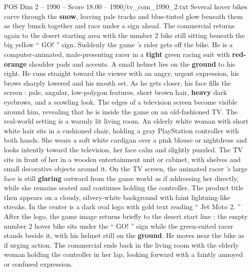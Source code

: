 \begin{textsample}{POS Dim 2 – 1990 – Score 18.00 – 1990/tv\_com\_1990\_2.txt}
Several hover bikes carve through the \textbf{snow}, leaving pale tracks and blue-tinted glow beneath them as they bunch together and race under a sign ahead.
The commercial returns again to the desert starting area with the number 2 bike still sitting beneath the big yellow “ GO! ” sign.
Suddenly the game ’s rider gets off the bike.
He is a computer-animated, male-presenting racer in a \textbf{tight} green racing suit with \textbf{red-orange} shoulder pads and accents.
A small helmet lies on the \textbf{ground} to his right.
He runs straight toward the viewer with an angry, urgent expression, his brows sharply lowered and his mouth set.
As he gets closer, his face fills the screen : pale, angular, low-polygon features, short brown hair, \textbf{heavy} dark eyebrows, and a scowling look.
The edges of a television screen become visible around him, revealing that he is inside the game on an old-fashioned TV.
The real-world setting is a warmly lit living room.
An elderly white woman with short white hair sits in a cushioned chair, holding a gray PlayStation controller with both hands.
She wears a soft white cardigan over a pink blouse or nightdress and looks intently toward the television, her face calm and slightly puzzled.
The TV sits in front of her in a wooden entertainment unit or cabinet, with shelves and small decorative objects around it.
On the TV screen, the animated racer ’s large face is still \textbf{glaring} outward from the game world as if addressing her directly, while she remains seated and continues holding the controller.
The product title then appears on a cloudy, silvery-white background with faint lightning-like streaks.
In the center is a dark oval logo with gold text reading “ Jet Moto 2. ” After the logo, the game image returns briefly to the desert start line : the empty number 2 hover bike sits under the “ GO! ” sign while the green-suited racer stands beside it, with his helmet still on the \textbf{ground}.
He moves near the bike as if urging action.
The commercial ends back in the living room with the elderly woman holding the controller in her lap, looking forward with a faintly annoyed or confused expression.

\end{textsample}
